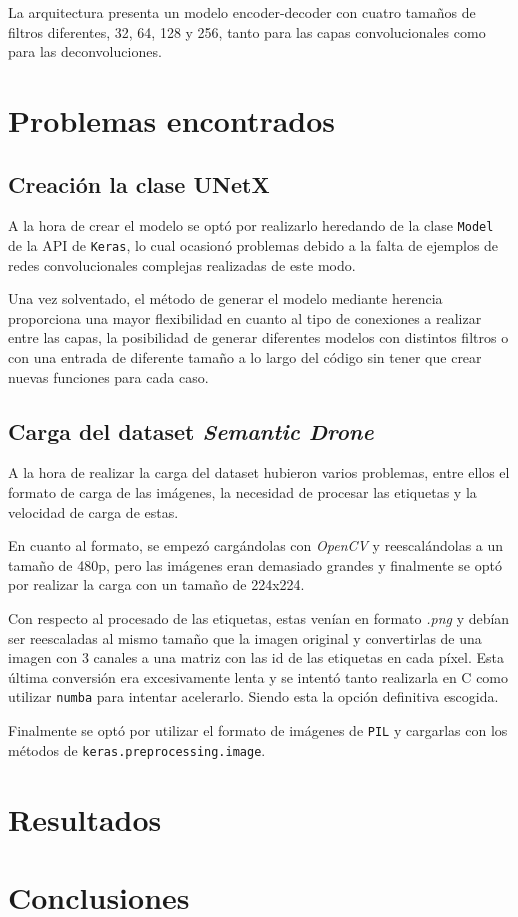 \documentclass[a4paper]{article}
\begin{document}
La arquitectura presenta un modelo encoder-decoder con cuatro tama\~nos de filtros diferentes, 32, 64, 128 y 256, tanto para las capas convolucionales como para las deconvoluciones.

\section{Problemas encontrados}
\subsection{Creación la clase UNetX}
A la hora de crear el modelo se optó por realizarlo heredando de la clase \texttt{Model} de la API de \texttt{Keras}, lo cual ocasionó problemas debido a la falta de ejemplos de redes convolucionales complejas realizadas de este modo.
\newline

Una vez solventado, el m\'etodo de generar el modelo mediante herencia proporciona una mayor flexibilidad en cuanto al tipo de conexiones a realizar entre las capas, la posibilidad de generar diferentes modelos con distintos filtros o con una entrada de diferente tama\~no a lo largo del c\'odigo sin tener que crear nuevas funciones para cada caso.


\subsection{Carga del dataset \textit{Semantic Drone}}
A la hora de realizar la carga del dataset hubieron varios problemas, entre ellos el formato de carga de las imágenes, la necesidad de procesar las etiquetas y la velocidad de carga de estas.\newline

En cuanto al formato, se empezó cargándolas con \textit{OpenCV} y reescal\'andolas a un tamaño de 480p, pero las imágenes eran demasiado grandes y finalmente se optó por realizar la carga con un tamaño de 224x224.\newline

Con respecto al procesado de las etiquetas, estas venían en formato \textit{.png} y debían ser reescaladas al mismo tamaño que la imagen original y convertirlas de una imagen con 3 canales a una matriz con las id de las etiquetas en cada píxel. Esta última conversión era excesivamente lenta y se intentó tanto realizarla en C como utilizar \texttt{numba} para intentar acelerarlo. Siendo esta la opción definitiva escogida.\newline

Finalmente se optó por utilizar el formato de imágenes de \texttt{PIL} y cargarlas con los métodos de \texttt{keras.preprocessing.image}.

\section{Resultados}

\section{Conclusiones}

\newpage
\printbibliography
\end{document}
